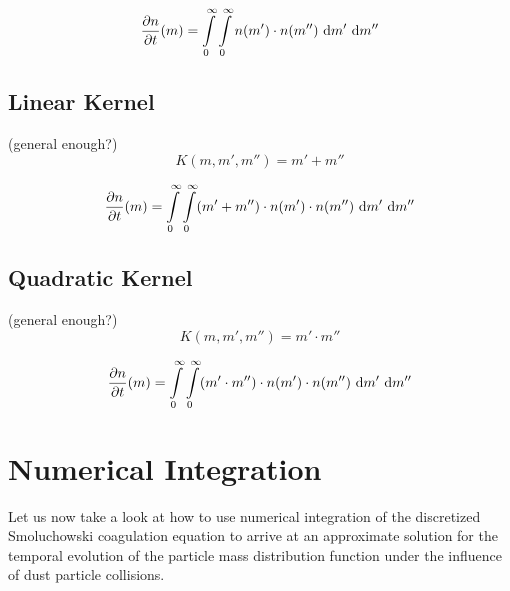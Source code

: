     \begin{equation}
        \frac{\partial n}{\partial t}(m)
            = 
                \int\limits_0^\infty \int\limits_0^\infty
                n(m') \cdot n(m'')
                \ \text{d} m' \ \text{d} m''
    \end{equation}

    \subsection{Linear Kernel}

     (general enough?)
    \begin{equation}
        K(m, m', m'')
            = m' + m''
    \end{equation}

    \begin{equation}
        \frac{\partial n}{\partial t}(m)
            = 
                \int\limits_0^\infty \int\limits_0^\infty
                (m' + m'') \cdot
                n(m') \cdot n(m'')
                \ \text{d} m' \ \text{d} m''
    \end{equation}

    \subsection{Quadratic Kernel}

     (general enough?)
    \begin{equation}
        K(m, m', m'')
            = m' \cdot m''
    \end{equation}

    \begin{equation}
        \frac{\partial n}{\partial t}(m)
            = 
                \int\limits_0^\infty \int\limits_0^\infty
                (m' \cdot m'') \cdot
                n(m') \cdot n(m'')
                \ \text{d} m' \ \text{d} m''
    \end{equation}


\newpage\section{Numerical Integration}

    Let us now take a look at how to use numerical integration of the discretized 
    Smoluchowski coagulation equation to arrive at an approximate solution for the temporal 
    evolution of the particle mass distribution function under the influence of dust particle 
    collisions. 

